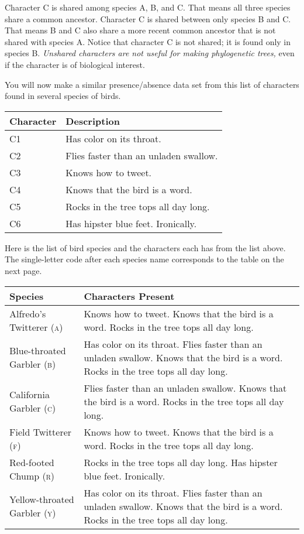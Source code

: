 \documentclass[12pt, hidelinks]{exam}
\begin{document}
Character C{} is shared among species A, B, and C. That means all three species share a common ancestor. Character C{} is shared between only species B and C. That means B and C also share a more recent common ancestor that is not shared with species A. Notice that character C{} is not shared; it is found only in species B. \emph{Unshared characters are not useful for making phylogenetic trees,} even if the character is of biological interest.


\vspace{\baselineskip}

\begin{questions}

\question
You will now make a similar presence/absence data set from this list of characters found in several species of birds. 

{\liningnum
\begin{tabular}{ll}
\toprule
Character	&	Description	\tabularnewline
\midrule
C1	&	Has color on its throat.	\tabularnewline
C2	&	Flies faster than an unladen swallow. \tabularnewline
C3	&	Knows how to tweet. \tabularnewline
C4	&	Knows that the bird is a word. \tabularnewline
C5	&	Rocks in the tree tops all day long. \tabularnewline
C6	&	Has hipster blue feet. Ironically. \tabularnewline
\bottomrule
\end{tabular}
}

\vspace{\baselineskip}

Here is the list of bird species and the characters each has from the list above. The single-letter  code after each species name corresponds to the table on the next page.

\begin{longtable}[l]{@{}lL{3.5in}@{}}
\toprule
Species	&	Characters Present	\tabularnewline
\midrule
Alfredo's Twitterer \textsc{(a)} & Knows how to tweet. Knows that the bird is a word. Rocks in the tree tops all day long.\tabularnewline
Blue-throated Garbler \textsc{(b)} & Has color on its throat. Flies faster than an unladen swallow. Knows that the bird is a word. Rocks in the tree tops all day long. \tabularnewline
California Garbler \textsc{(c)} & Flies faster than an unladen swallow. Knows that the bird is a word. Rocks in the tree tops all day long. \tabularnewline
Field Twitterer \textsc{(f)} & Knows how to tweet. Knows that the bird is a word. Rocks in the tree tops all day long. \tabularnewline
Red-footed Chump \textsc{(r)} & Rocks in the tree tops all day long. Has hipster blue feet. Ironically. \tabularnewline
Yellow-throated Garbler \textsc{(y)} & Has color on its throat. Flies faster than an unladen swallow. Knows that the bird is a word. Rocks in the tree tops all day long. \tabularnewline
\bottomrule
\end{longtable}


\end{questions}
\end{document}
